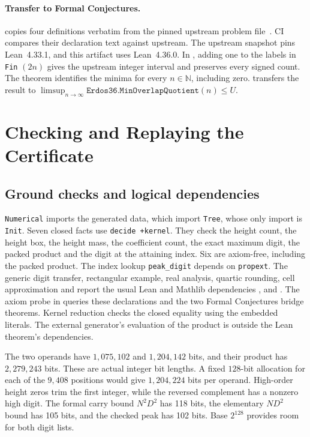 \documentclass[sigplan,10pt,anonymous,review,balance=false]{acmart}
\newcommand{\leanid}[1]{\texttt{#1}}
\begin{document}
\paragraph{Transfer to Formal Conjectures.}
 copies four definitions
verbatim from the pinned upstream problem file~\cite{FormalConjecturesErdos36}.
CI compares their declaration text against upstream. The upstream
snapshot pins Lean~4.33.1, and this artifact uses Lean~4.36.0.
In , adding one to the labels in
\leanid{Fin} $(2n)$ gives the upstream integer interval and preserves
every signed count. The theorem 
identifies the minima for every $n\in\mathbb N$, including zero.
 transfers the result to
$\limsup_{n\to\infty}\texttt{Erdos36.MinOverlapQuotient}(n)\le U$.

\section{Checking and Replaying the Certificate}
\label{sec:eval}

\subsection{Ground checks and logical dependencies}

\leanid{Numerical} imports the generated data, which import
\leanid{Tree}, whose only import is \leanid{Init}.
Seven closed facts use \leanid{decide +kernel}. They check the
height count, the height box, the height mass, the coefficient
count, the exact maximum digit, the packed product and the digit
at the attaining index. Six are axiom-free, including the
packed product. The index lookup \leanid{peak\_digit} depends on
\leanid{propext}. The generic digit transfer, rectangular example, real analysis,
quartic rounding, cell approximation and 
report the usual Lean and Mathlib dependencies ,
 and .
The axiom probe in  queries these
declarations and the two Formal Conjectures bridge theorems.
Kernel reduction checks the closed equality using the embedded
literals. The external generator's evaluation of the product
is outside the Lean theorem's dependencies.

The two operands have $1{,}075{,}102$ and $1{,}204{,}142$ bits,
and their product has $2{,}279{,}243$ bits. These are actual integer
bit lengths. A fixed $128$-bit allocation for each of the $9{,}408$
positions would give $1{,}204{,}224$ bits per operand.
High-order height zeros trim the first integer, while the reversed
complement has a nonzero high digit. The formal carry bound
$N^2D^2$ has 118 bits, the elementary $ND^2$ bound has 105 bits,
and the checked peak has 102 bits. Base $2^{128}$ provides room for
both digit lists.
\end{document}
